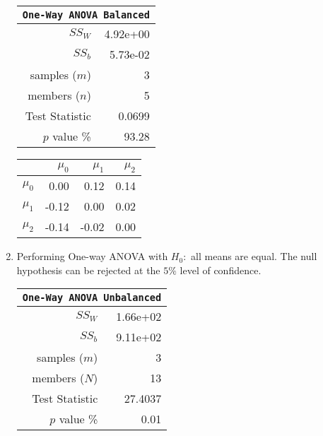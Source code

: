 \begin{enumerate}
	\begin{table}[H]
		\centering
		\begin{minipage}{0.4\textwidth}
			\centering
			\begin{tabular}{@{}rr@{}}
				\toprule
				\multicolumn{2}{c}{\texttt{One-Way ANOVA Balanced}} \\
				\midrule
				$SS_W$         &               4.92e+00 \\
				$SS_b$         &               5.73e-02 \\
				samples ($m$)  &                      3 \\
				members ($n$)  &                      5 \\
				Test Statistic &                 0.0699 \\
				$p$ value \%   &                  93.28 \\
				\bottomrule
			\end{tabular}
		\end{minipage}
		\begin{minipage}{0.4\textwidth}
			\centering
			\begin{tabular}{lrrr}
				\toprule
				{} &  $\mu_0$ &  $\mu_1$ &  $\mu_2$ \\
				\midrule
				$\mu_0$ &     0.00 &     0.12 &     0.14 \\
				$\mu_1$ &    -0.12 &     0.00 &     0.02 \\
				$\mu_2$ &    -0.14 &    -0.02 &     0.00 \\
				\bottomrule
			\end{tabular}
		\end{minipage}
	\end{table}

	\item Performing One-way ANOVA with $ H_0 : $ all means are equal. The null hypothesis can be rejected at the $ 5\% $ level of confidence.
	
	\begin{table}[H]
		\centering
		\begin{tabular}{@{}rr@{}}
			\toprule
			\multicolumn{2}{c}{\texttt{One-Way ANOVA Unbalanced}} \\
			\midrule
			$SS_W$         &               1.66e+02 \\
			$SS_b$         &               9.11e+02 \\
			samples ($m$)  &                      3 \\
			members ($N$)  &                     13 \\
			Test Statistic &                27.4037 \\
			$p$ value \%   &                   0.01 \\
			\bottomrule
		\end{tabular}
		

\end{table}
\end{enumerate}
